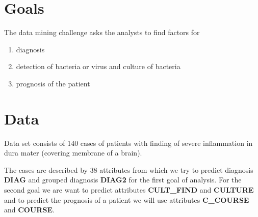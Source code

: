 \documentclass[11pt]{article}
\begin{document}
\section{Goals}
The data mining challenge asks the analysts to find factors for
\begin{enumerate}
    \item diagnosis
    \item detection of bacteria or virus and culture of bacteria
    \item prognosis of the patient
\end{enumerate}

\section{Data}
Data set consists of 140 cases of patients with finding of severe inflammation
in dura mater (covering membrane of a brain).

The cases are described by 38 attributes from which we try to predict diagnosis
{\bf DIAG} and grouped diagnosis {\bf DIAG2} for the first goal of analysis.
For the second goal we are want to predict attributes {\bf CULT\_FIND} and {\bf
CULTURE} and to predict the prognosis of a patient we will use attributes {\bf
C\_COURSE} and {\bf COURSE}.


\mbox{}\\[.2cm]
\begin{table}[h]
\caption*{\bf Attributes known before physical examination - early symptoms}
\label{tab:attrs_examination}
\end{table}
\end{document}
